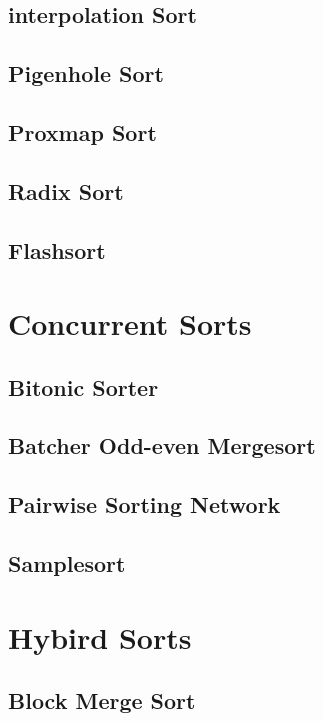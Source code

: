 			\subsection{interpolation Sort}

			\subsection{Pigenhole Sort}

			\subsection{Proxmap Sort}

			\subsection{Radix Sort}

			\subsection{Flashsort}

		\section{Concurrent Sorts}
			\subsection{Bitonic Sorter}

			\subsection{Batcher Odd-even Mergesort}

			\subsection{Pairwise Sorting Network}

			\subsection{Samplesort}

		\section{Hybird Sorts}
			\subsection{Block Merge Sort}


